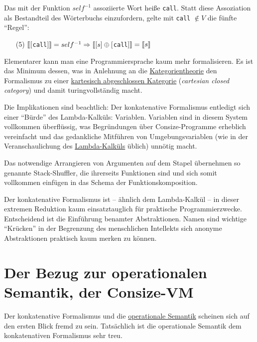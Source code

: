 Das mit der Funktion $self^{-1}$ assoziierte Wort heiße \verb|call|. Statt diese Assoziation als Bestandteil des Wörterbuchs einzufordern, gelte mit \verb|call| $\notin V$ die fünfte "`Regel"':

\begin{enumerate}
\item[(5)] $[\hspace{-1.5pt}[ [$\verb|call|$] ]\hspace{-1.5pt}] = self^{-1}
\Rightarrow
[\hspace{-1.5pt}[ [s]\oplus[$\verb|call|$] ]\hspace{-1.5pt}] = [\hspace{-1.5pt}[ s ]\hspace{-1.5pt}]$
\end{enumerate}

Elementarer kann man eine Programmiersprache kaum mehr formalisieren. Es ist das Minimum dessen, was in Anlehnung an die \href{http://de.wikipedia.org/wiki/Kategorientheorie}{Kategorientheorie} den Formalismus zu einer \href{http://de.wikipedia.org/wiki/Kartesisch\_abgeschlossene\_Kategorie}{kartesisch abgeschlossen Kategorie} (\emph{cartesian closed category}) und damit turingvollständig macht.

Die Implikationen sind beachtlich: Der konkatenative Formalismus entledigt sich einer "`Bürde"' des Lambda-Kalküls: Variablen. Variablen sind in diesem System vollkommen überflüssig, was Begründungen über Consize-Programme erheblich vereinfacht und das gedankliche Mitführen von Umgebungsvariablen (wie in der Veranschaulichung des \href{http://de.wikipedia.org/wiki/Lambda-Kalk\%C3\%BCl}{Lambda-Kalküls} üblich) unnötig macht.

Das notwendige Arrangieren von Argumenten auf dem Stapel übernehmen so genannte Stack-Shuffler, die ihrerseits Funktionen sind und sich somit vollkommen einfügen in das Schema der Funktionskomposition.

Der konkatenative Formalismus ist -- ähnlich dem Lambda-Kalkül -- in dieser extremen Reduktion kaum einsatztauglich für praktische Programmierzwecke. Entscheidend ist die Einführung benamter Abstraktionen. Namen sind wichtige "`Krücken"' in der Begrenzung des menschlichen Intellekts sich anonyme Abstraktionen praktisch kaum merken zu können.

\section{Der Bezug zur operationalen Semantik, der Consize-VM}

Der konkatenative Formalismus und die \href{http://de.wikipedia.org/wiki/Operationale\_Semantik}{operationale Semantik} scheinen sich auf den ersten Blick fremd zu sein. Tatsächlich ist die operationale Semantik dem konkatenativen Formalismus sehr treu.

